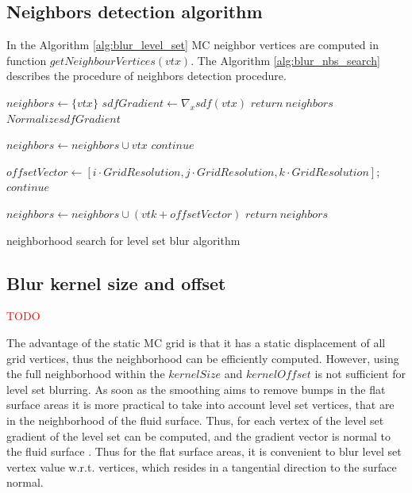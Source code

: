  \subsection{Neighbors detection algorithm}
In the Algorithm \ref{alg:blur_level_set} MC neighbor vertices are computed in function $getNeighbourVertices(vtx)$. The Algorithm \ref{alg:blur_nbs_search} describes the procedure of neighbors detection procedure.
\begin{algorithm}[H]
	\scriptsize
	\begin{algorithmic}
		\State $neighbors \gets \{vtx\}$
		\State $sdfGradient \gets \nabla_x sdf(vtx)$
			\State $return\ neighbors$
		\EndIf
		\State $Normalize sdfGradient$
		
						\State $neighbors \gets neighbors \cup vtx$
						\State $continue$
					\EndIf
					
					\State $offsetVector \gets [i \cdot GridResolution, j \cdot GridResolution, k \cdot GridResolution]$;
						\State $continue$
					\EndIf
					
					\State $neighbors \gets neighbors \cup (vtk + offsetVector)$
				\EndFor
			\EndFor
		\EndFor
		\State $return\ neighbors$
	\end{algorithmic}
	\caption{neighborhood search for level set blur algorithm}
	\label{alg:blur_nbs_search}
\end{algorithm}
\subsection{Blur kernel size and offset}
\textcolor{red}{TODO}

The advantage of the static MC grid is that it has a static displacement of all grid vertices, thus the neighborhood can be efficiently computed. However, using the full neighborhood within the $kernelSize$ and $kernelOffset$ is not sufficient for level set blurring. As soon as the smoothing aims to remove bumps in the flat surface areas it is more practical to take into account level set vertices, that are in the neighborhood of the fluid surface. Thus, for each vertex of the level set gradient of the level set can be computed, and the gradient vector is normal to the fluid surface \cite{LevelSetMethods}. Thus for the flat surface areas, it is convenient to blur level set vertex value w.r.t. vertices, which resides in a tangential direction to the surface normal.

